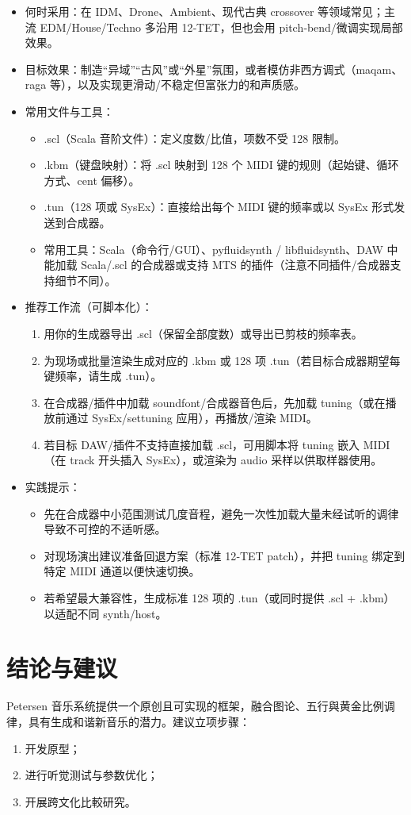 \documentclass{article}
\begin{document}
\begin{itemize}
  \item 何时采用：在 IDM、Drone、Ambient、现代古典 crossover 等领域常见；主流 EDM/House/Techno 多沿用 12‑TET，但也会用 pitch‑bend/微调实现局部效果。
  \item 目标效果：制造“异域”“古风”或“外星”氛围，或者模仿非西方调式（maqam、raga 等），以及实现更滑动/不稳定但富张力的和声质感。
  \item 常用文件与工具：
    \begin{itemize}
      \item .scl（Scala 音阶文件）：定义度数/比值，项数不受 128 限制。
      \item .kbm（键盘映射）：将 .scl 映射到 128 个 MIDI 键的规则（起始键、循环方式、cent 偏移）。
      \item .tun（128 项或 SysEx）：直接给出每个 MIDI 键的频率或以 SysEx 形式发送到合成器。
      \item 常用工具：Scala（命令行/GUI）、pyfluidsynth / libfluidsynth、DAW 中能加载 Scala/.scl 的合成器或支持 MTS 的插件（注意不同插件/合成器支持细节不同）。
    \end{itemize}
  \item 推荐工作流（可脚本化）：
    \begin{enumerate}
      \item 用你的生成器导出 .scl（保留全部度数）或导出已剪枝的频率表。
      \item 为现场或批量渲染生成对应的 .kbm 或 128 项 .tun（若目标合成器期望每键频率，请生成 .tun）。
      \item 在合成器/插件中加载 soundfont/合成器音色后，先加载 tuning（或在播放前通过 SysEx/settuning 应用），再播放/渲染 MIDI。
      \item 若目标 DAW/插件不支持直接加载 .scl，可用脚本将 tuning 嵌入 MIDI（在 track 开头插入 SysEx），或渲染为 audio 采样以供取样器使用。
    \end{enumerate}
  \item 实践提示：
    \begin{itemize}
      \item 先在合成器中小范围测试几度音程，避免一次性加载大量未经试听的调律导致不可控的不适听感。
      \item 对现场演出建议准备回退方案（标准 12‑TET patch），并把 tuning 绑定到特定 MIDI 通道以便快速切换。
      \item 若希望最大兼容性，生成标准 128 项的 .tun（或同时提供 .scl + .kbm）以适配不同 synth/host。
    \end{itemize}
\end{itemize}

\section{结论与建议}
Petersen 音乐系统提供一个原创且可实现的框架，融合图论、五行與黄金比例调律，具有生成和谐新音乐的潜力。建议立项步骤：
\begin{enumerate}
  \item 开发原型；
  \item 进行听觉测试与参数优化；
  \item 开展跨文化比較研究。
\end{enumerate}
\end{document}
